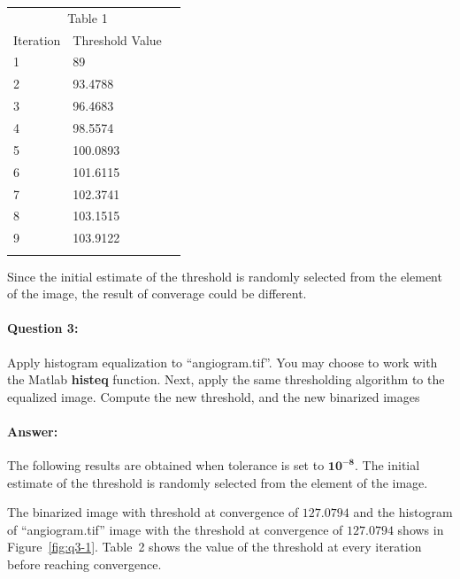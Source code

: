 \documentclass[12pt, letter]{article}
\begin{document}
\begin{center}
\begin{tabular}{llr}  
\toprule
\multicolumn{2}{c}{Table 1} \\
\cmidrule(r){1-2}
Iteration   & Threshold Value \\
\midrule
1      & 89 \\
2 & 93.4788 \\
3  & 96.4683 \\
4     & 98.5574 \\
5 & 100.0893 \\
6 & 101.6115 \\
7 & 102.3741 \\
8 & 103.1515 \\
9 & 103.9122 \\
\bottomrule
\label{table:q2-1}
\end{tabular}    
\end{center}

Since the initial estimate of the threshold is randomly selected from the element of the image, the result of converage could be different. 

\paragraph{Question 3:} Apply histogram equalization to ``angiogram.tif''. You may choose to work with the Matlab \textbf{histeq} function. Next, apply the same thresholding algorithm to the equalized image. Compute the new threshold, and the new binarized images

\paragraph{Answer:} The following results are obtained when tolerance is set to $\mathbf{10^{-8}}$. The initial estimate of the threshold is randomly selected from the element of the image.  

The binarized image with threshold at convergence of $\mathbf{127.0794}$ and the histogram of ``angiogram.tif'' image with the threshold at convergence of $\mathbf{127.0794}$ shows in Figure~\ref{fig:q3-1}. Table~2 shows the value of the threshold at every iteration before reaching convergence.
\end{document}
